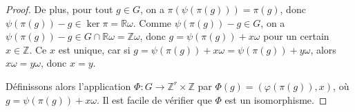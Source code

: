 \documentclass{article}
\newcommand{\R}{\mathbb{R}}
\newcommand{\Z}{\mathbb{Z}}
\begin{document}
\begin{proof}
    De plus, pour tout $g \in G$, on a $\pi(\psi(\pi(g))) = \pi(g)$, donc $\psi(\pi(g)) - g \in \ker \pi = \R \omega$. Comme $\psi(\pi(g)) - g \in G$, on a $\psi(\pi(g)) - g \in G \cap \R \omega = \Z \omega$, donc $g = \psi(\pi(g)) + x \omega$ pour un certain $x \in \Z$. Ce $x$ est unique, car si $g = \psi(\pi(g)) + x \omega = \psi(\pi(g)) + y \omega$, alors $x\omega = y\omega$, donc $x = y$.

    Définissons alors l'application $\Phi \colon G \to \Z^r \times \Z$ par $\Phi(g) = (\varphi(\pi(g)), x)$, où $g = \psi(\pi(g)) + x \omega$. Il est facile de vérifier que $\Phi$ est un isomorphisme.
\end{proof}
\end{document}
